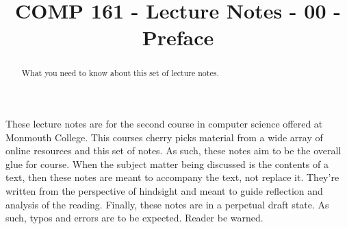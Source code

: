 \documentclass[]{tufte-handout}
\title{COMP 161 - Lecture Notes - 00 -Preface}
\begin{document}
\maketitle

\begin{abstract}
What you need to know about this set of lecture notes.
\end{abstract}

These lecture notes are for the second course in computer science offered at Monmouth College.  This courses cherry picks material from a wide array of online resources and this set of notes.  As such, these notes aim to be the overall glue for course.  When the subject matter being discussed is the contents of a text, then these notes are meant to accompany the text, not replace it.  They're written from the perspective of hindsight and meant to guide reflection and analysis of the reading. 
Finally, these notes are in a perpetual draft state. As such, typos and errors are to be expected. Reader be warned.
\end{document}
